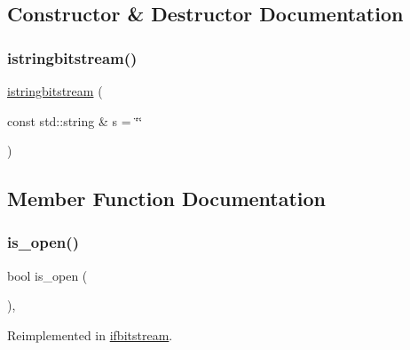 \subsection{Constructor \& Destructor Documentation}
\mbox{\label{classistringbitstream_ae086e9a41bc91c4c64af792ff0aff81d}} 
\subsubsection{\texorpdfstring{istringbitstream()}{istringbitstream()}}
{\footnotesize\ttfamily \mbox{\hyperlink{classistringbitstream}{istringbitstream}} (\begin{DoxyParamCaption}\item[{const std\+::string \&}]{s = {\ttfamily \char`\"{}\char`\"{}} }\end{DoxyParamCaption})}



\subsection{Member Function Documentation}
\mbox{\label{classibitstream_a2f57f54d8c03b615bb31eee091d8a88a}} 
\subsubsection{\texorpdfstring{is\+\_\+open()}{is\_open()}}
{\footnotesize\ttfamily bool is\+\_\+open (\begin{DoxyParamCaption}{ }\end{DoxyParamCaption})\hspace{0.3cm}{\ttfamily [virtual]}, {\ttfamily [inherited]}}



Reimplemented in \mbox{\hyperlink{classifbitstream_a2f57f54d8c03b615bb31eee091d8a88a}{ifbitstream}}.

\mbox{\label{classibitstream_aa8c615fa7957fb0232a0873dadbd39e8}} 
